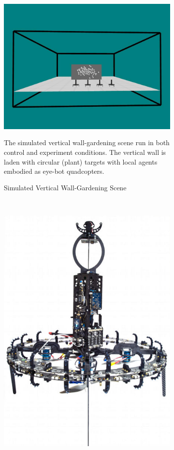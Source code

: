 \documentclass{report}
\begin{document}
\newpage
\begin{figure}
	\begin{subfigure}[b]{0.6\textwidth}
		\centering
		\includegraphics[width=\textwidth]{images/VerticalWallGardeningScene}
		\caption{Simulated Vertical Wall-Gardening Scene}
		\label{fig:sim_orig_scene}
		{The simulated vertical wall-gardening scene run in both control and experiment conditions. The vertical wall is laden with circular (plant) targets with local agents embodied as eye-bot quadcopters}.
	\end{subfigure}
	~
	\begin{subfigure}[b]{0.4\textwidth}
		\centering
		\includegraphics[width=\textwidth]{images/EyebotCarbonFrame}

\end{subfigure}
\end{figure}
\end{document}
